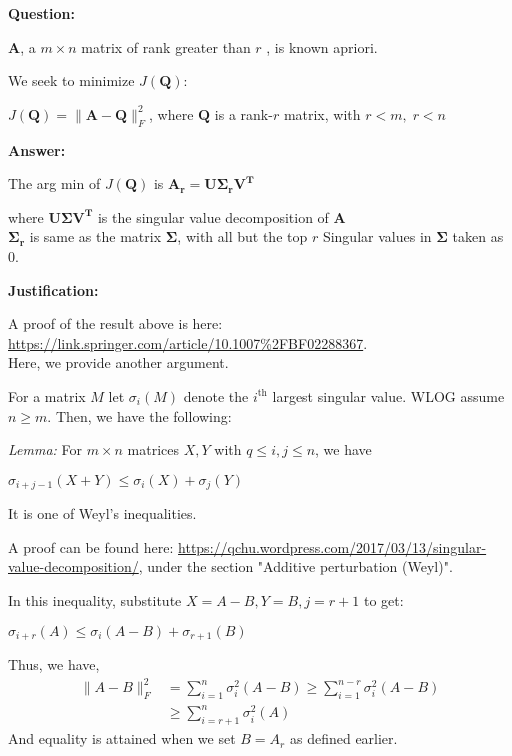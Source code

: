 \documentclass[fleqn, 11pt]{article}
\newcommand{\bs}[1]{\boldsymbol{#1}}
\begin{document}
\textbf{Question: }

\smallskip

$\boldsymbol{A}$, a $m \times n$ matrix of rank greater than $r$ , is known apriori.

\smallskip

We seek to minimize $J(\boldsymbol{Q})$:
\begin{center}
    $J(\boldsymbol{Q}) = \|\boldsymbol{A}-\boldsymbol{Q}\|^2_F$, where $\boldsymbol{Q}$ is a rank-$r$ matrix, with $r < m, \; r < n$
\end{center}
\hrulefill

\medskip

\textbf{Answer: }

\medskip

The arg min of $J(\boldsymbol{Q})$ is $\bs{A_r=U \Sigma_r V^T}$ 

\smallskip

where $\bs{U \Sigma V^T}$ is the singular value decomposition of $\bs{A}$ \\
$\bs{\Sigma_r} $ is same as the matrix
$\bs{\Sigma} $, with all but the top $r$ Singular values in $\bs{\Sigma}$ taken as 0.

\hrulefill

\medskip

\textbf{Justification: }

A proof of the result above is here: \url{https://link.springer.com/article/10.1007\%2FBF02288367}. \\
Here, we provide another argument.

\medskip

For a matrix $M$ let $\sigma_i(M)$ denote the $i^{\text{th}}$ largest singular value.
WLOG assume $n \geq  m$.
Then, we have the following: 

\textit{Lemma: } For $m \times n$ matrices $X,Y$ with $q \leq i, j \leq n$, 
we have
\begin{center}
   $ \sigma_{i+j - 1}(X + Y) \leq \sigma_i(X) + \sigma_j(Y) $
\end{center}

It is one of Weyl's inequalities. 

A proof can be found here: \url{https://qchu.wordpress.com/2017/03/13/singular-value-decomposition/}, 
under the section "Additive perturbation (Weyl)". 

In this inequality, substitute $X = A-B, Y = B, j = r+1$ to get:
\begin{center}
    $\sigma_{i+r}(A) \leq \sigma _{i}(A - B) + \sigma_{r+1}(B)$
\end{center}
Thus, we have,
    \begin{align*}
\|A - B\|_F^2 &= 
\sum_{i=1}^n \sigma_i^2(A - B) \geq 
\sum_{i=1}^{n-r} \sigma_i^2(A - B)
\\ & \geq \sum_{i=r+1}^{n} \sigma_i^2(A)
\end{align*}
And equality is attained when we set $B=A_r$ as defined earlier. 
\end{document}
